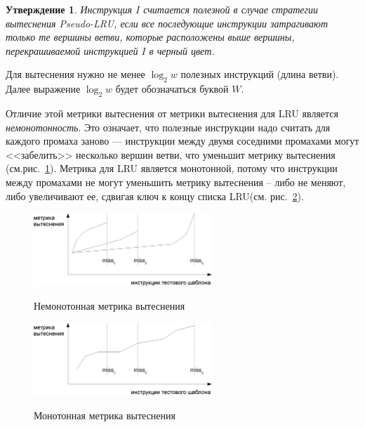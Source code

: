 \documentclass[14pt]{extreport}
\newtheorem{utv}{Утверждение}
\newcommand{\LRU}{\textsf{LRU}\xspace}
\newcommand{\PseudoLRU}{\textsf{Pseudo-LRU}\xspace}
\begin{document}
%

\begin{utv}
Инструкция $I$ считается полезной в случае стратегии вытеснения
\PseudoLRU, если все последующие инструкции затрагивают только те
вершины ветви, которые расположены выше вершины, перекрашиваемой инструкцией $I$
в черный цвет.
\end{utv}

Для вытеснения нужно не менее $\log_2 w$ полезных инструкций (длина ветви).
Далее выражение $\log_2 w$ будет обозначаться буквой $W$.

Отличие этой метрики вытеснения от метрики вытеснения для \LRU
является \emph{немонотонность}. Это означает, что полезные
инструкции надо считать для каждого промаха заново ---
инструкции между двумя соседними промахами могут <<забелить>>
несколько вершин ветви, что уменьшит метрику вытеснения
(см.рис.~\ref{nonmonotonic}). Метрика для \LRU является монотонной,
потому что инструкции между промахами не могут уменьшить метрику
вытеснения -- либо не меняют, либо увеличивают ее, сдвигая
ключ к концу списка \LRU (см. рис.~\ref{monotonic}).

\begin{figure}[h] \center
  \includegraphics[width=0.6\textwidth]{2.theor/nonmonotonic}\\
  \caption{Немонотонная метрика вытеснения}\label{nonmonotonic}
\end{figure}

\begin{figure}[h] \center
  \includegraphics[width=0.6\textwidth]{2.theor/monotonic}\\
  \caption{Монотонная метрика вытеснения}\label{monotonic}
\end{figure}
\end{document}
